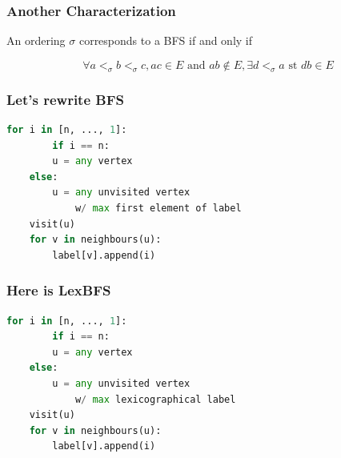 \documentclass{beamer}
\begin{document}
\begin{frame}\frametitle{Another Characterization}
    \begin{theorem}
        An ordering $\sigma$ corresponds to a BFS if and only if
	    
	    $$\forall a <_{\sigma} b <_{\sigma} c, ac \in E\text{ and }ab \notin E, \exists d <_{\sigma} a\text{ st }db \in E$$
    \end{theorem}

    \begin{center}
    \end{center}

\end{frame}

\begin{frame}[fragile]\frametitle{Let's rewrite BFS}
    \begin{lstlisting}[language = Python]
    for i in [n, ..., 1]:
        if i == n:
	    u = any vertex
	else:
	    u = any unvisited vertex
	        w/ max first element of label
	visit(u)
	for v in neighbours(u):
	    label[v].append(i)
    \end{lstlisting}
\end{frame}

\begin{frame}[fragile]\frametitle{Here is LexBFS}
    \begin{lstlisting}[language = Python]
    for i in [n, ..., 1]:
        if i == n:
	    u = any vertex
	else:
	    u = any unvisited vertex
	        w/ max lexicographical label
	visit(u)
	for v in neighbours(u):
	    label[v].append(i)
    \end{lstlisting}
\end{frame}
\end{document}
